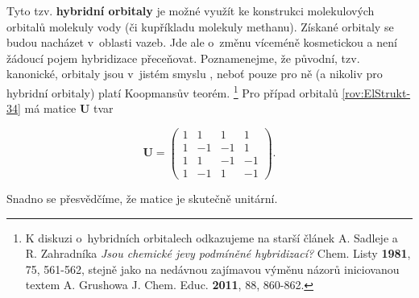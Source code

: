 Tyto tzv. \textbf{hybridní orbitaly} je možné využít ke konstrukci molekulových orbitalů molekuly vody (či kupříkladu molekuly methanu). Získané orbitaly se budou nacházet v~oblasti vazeb. Jde ale o~změnu víceméně kosmetickou a není žádoucí pojem hybridizace přeceňovat. Poznamenejme, že původní, tzv. kanonické, orbitaly jsou v~jistém smyslu , neboť pouze pro ně (a nikoliv pro hybridní orbitaly) platí Koopmansův teorém.
\footnote{K diskuzi o~hybridních orbitalech odkazujeme na starší článek A. Sadleje a R. Zahradníka \textit{Jsou chemické jevy podmíněné hybridizací?} Chem. Listy \textbf{1981}, 75, 561-562, stejně jako na nedávnou zajímavou výměnu názorů iniciovanou textem A. Grushowa \textit{} J. Chem. Educ. \textbf{2011}, 88, 860-862.}
Pro případ orbitalů \eqref{rov:ElStrukt-34} má matice $\mathbf{U}$ tvar

\begin{equation}
\mathbf{U} = 
\begin{pmatrix}
1 & 1 & 1 & 1 \\
1 & -1 & -1 & 1 \\
1 & 1 & -1 & -1\\
1 & -1 & 1 & -1
\end{pmatrix}.
\end{equation}

\noindent Snadno se přesvědčíme, že matice je skutečně unitární.

